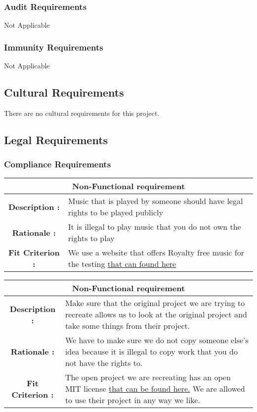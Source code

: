 \documentclass[12pt, titlepage]{article}
\begin{document}
\subsubsection{Audit Requirements}
Not Applicable
\subsubsection{Immunity Requirements}
Not Applicable

\subsection{Cultural Requirements}
There are no cultural requirements for this project.
\subsection{Legal Requirements}
\subsubsection{Compliance Requirements}

\begin{center}
\begin{table}[H]
\begin{tabularx}{\textwidth}{| c X |}
\hline
\multicolumn{2}{|c|}{\textbf{Non-Functional requirement}}\\
\hline
\textbf{Description : } &  Music that is played by someone should have legal rights to be played publicly \\
\hline
\textbf{Rationale : } & It is illegal to play music that you do not own the rights to play \\
\hline
\textbf{Fit Criterion : } & We use a website that offers Royalty free music for the testing \href{http://www.bensound.com/}{that can found here} \\
\hline
\end{tabularx}
\end{table}
\end{center}

\begin{center}

\begin{table} [H]
\begin{tabularx}{\textwidth}{| c X |}
\hline
\multicolumn{2}{|c|}{\textbf{Non-Functional requirement}}\\
\hline
\textbf{Description : } & Make sure that the original project we are trying to recreate allows us to look at the original project and take some things from their project. \\
\hline
\textbf{Rationale : } & We have to make sure we do not copy someone else's idea because it is illegal to copy work that you do not have the rights to. \\
\hline
\textbf{Fit Criterion : } & The open project we are recreating has an open MIT license \href{LICENSE.txt} {that can be found here.} We are allowed to use their project in any way we like.\\
\hline
\end{tabularx}
\end{table}
\end{center}
\end{document}
